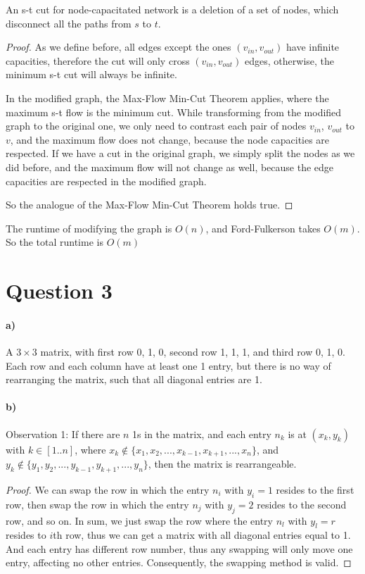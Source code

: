 \documentclass[letter,12pt]{article}
\begin{document}
An s-t cut for node-capacitated network is a deletion of a set of nodes,
which disconnect all the paths from $s$ to $t$.

\begin{proof}
As we define before, all edges except the ones $(v_{in}, v_{out})$ have infinite 
capacities, therefore the cut will only cross $(v_{in}, v_{out})$ edges, 
otherwise, the minimum s-t cut will always be infinite. 

In the modified graph, the Max-Flow Min-Cut Theorem applies, where the 
maximum s-t flow is the minimum cut. While transforming from the 
modified graph to the original one, we only need to contrast each pair of 
nodes $v_{in}$, $v_{out}$ to $v$, and the maximum flow does not change,
because the node capacities are respected.
If we have a cut in the original graph, we simply split the nodes as we did
before, and the maximum flow will not change as well, because the edge
capacities are respected in the modified graph. 

So the analogue of the Max-Flow Min-Cut Theorem holds true.
\end{proof} 

The runtime of modifying the graph is $O(n)$, and Ford-Fulkerson takes 
$O(m)$. So the total runtime is $O(m)$
\section*{Question 3}
\paragraph*{a)}
A $3 \times 3$ matrix, with first row 0, 1, 0, second row 1, 1, 1, and third
row 0, 1, 0. Each row and each column have at least one 1 entry, but there
is no way of rearranging the matrix, such that all diagonal entries are 1.

\paragraph*{b)}
Observation 1: If there are $n$ 1s  in the matrix, and each entry $n_k$ is 
at $(x_k, y_k)$ with $k \in [1..n]$, where $x_k \notin \{x_1, x_2, ..., x_{k-1}, 
x_{k+1},  ..., x_n\}$, and $y_k \notin \{y_1, y_2, ..., y_{k-1}, y_{k+1}, ..., 
y_n\}$, then the matrix is rearrangeable. 
\begin{proof}
We can swap the row in which the entry $n_i$ with $y_i = 1$ resides to the 
first row, then swap the row in which the entry $n_j$ with $y_j = 2$ 
resides to the second row, and so on. In sum, we just swap the row where 
the entry $n_l$ with $y_l = r$ resides to $i$th row, thus we can get a matrix
with all diagonal entries equal to 1. And each entry has different row 
number, thus any swapping will only move one entry, affecting no other
entries. Consequently, the swapping method is valid.
\end{proof}
 
\end{document}
